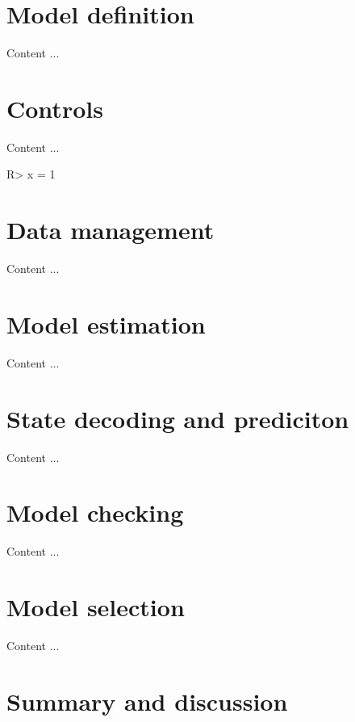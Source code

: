 \documentclass[article]{jss}
\begin{document}
\section{Model definition} \label{sec:model_definition}

Content ...

\section{Controls} \label{sec:controls}

Content ...

%
\begin{Schunk}
\begin{Sinput}
R> x = 1 
\end{Sinput}
\end{Schunk}
%

\section{Data management} \label{sec:data_management}

Content ...

\section{Model estimation} \label{sec:model_estimation}

Content ...

\section{State decoding and prediciton} \label{sec:state_decoding_and_prediction}

Content ...

\section{Model checking} \label{sec:model_checking}

Content ...

\section{Model selection} \label{sec:model_selection}

Content ...



\section{Summary and discussion} \label{sec:summary}
\end{document}
